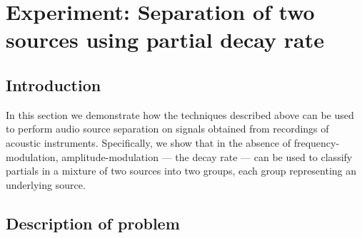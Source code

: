 \chapter{Experiment: Separation of two sources using partial decay rate
\label{chap:decaysep}}



\section{Introduction}

In this section we demonstrate how the techniques described above can be used to
perform audio source separation on signals obtained from recordings of acoustic
instruments. Specifically, we show that in the absence of frequency-modulation,
amplitude-modulation --- the decay rate --- can be used to classify partials
in a mixture of two sources into two groups, each group representing an
underlying source.

\section{Description of problem}

